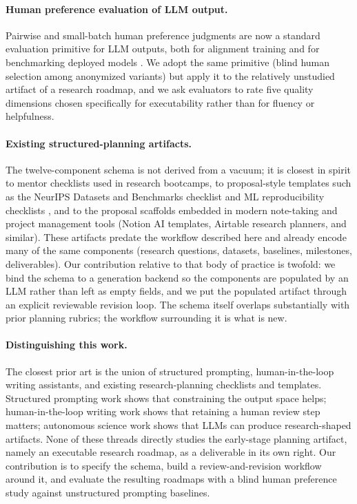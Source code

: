 \documentclass{article}
\begin{document}
\paragraph{Human preference evaluation of LLM output.}
Pairwise and small-batch human preference judgments are now a standard
evaluation primitive for LLM outputs, both for alignment training
\cite{ouyang2022instructgpt, bai2022rlhf} and for benchmarking deployed
models \cite{chiang2024chatbotarena, zheng2023llmasajudge}. We adopt the
same primitive (blind human selection among anonymized variants) but
apply it to the relatively unstudied artifact of a research roadmap, and
we ask evaluators to rate five quality dimensions chosen specifically
for executability rather than for fluency or helpfulness.

\paragraph{Existing structured-planning artifacts.}
The twelve-component schema is not derived from a vacuum; it is closest
in spirit to mentor checklists used in research bootcamps, to
proposal-style templates such as the NeurIPS Datasets and Benchmarks
checklist and ML reproducibility checklists \cite{pineau2021reproducibility},
and to the proposal scaffolds embedded in modern note-taking and project
management tools (Notion AI templates, Airtable research planners, and
similar). These artifacts predate the workflow described here and
already encode many of the same components (research questions,
datasets, baselines, milestones, deliverables). Our contribution
relative to that body of practice is twofold: we bind the schema to a
generation backend so the components are populated by an LLM rather
than left as empty fields, and we put the populated artifact through an
explicit reviewable revision loop. The schema itself overlaps
substantially with prior planning rubrics; the workflow surrounding it
is what is new.


\paragraph{Distinguishing this work.}
The closest prior art is the union of structured prompting,
human-in-the-loop writing assistants, and existing research-planning
checklists and templates. Structured prompting work shows
that constraining the output space helps; human-in-the-loop writing
work shows that retaining a human review step matters; autonomous
science work shows that LLMs can produce research-shaped artifacts.
None of these threads directly studies the early-stage planning
artifact, namely an executable research roadmap, as a deliverable in
its own right. Our contribution is to specify the schema, build a
review-and-revision workflow around it, and evaluate the resulting
roadmaps with a blind human preference study against unstructured
prompting baselines.
\end{document}
